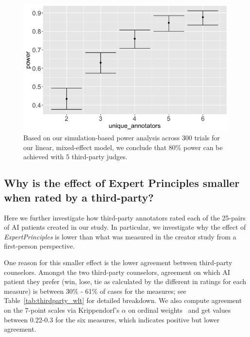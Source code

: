 \documentclass[11pt]{article}
\begin{document}
\begin{figure}[t]
    \centering
    \includegraphics[width=\columnwidth]{figures/power-analysis-300.png}
    \caption{Based on our simulation-based power analysis across 300 trials for our linear, mixed-effect model, we conclude that 80\% power can be achieved with 5 third-party judges.}
    \label{fig:power-analysis}
\end{figure}

\subsection{Why is the effect of Expert Principles smaller when rated by a third-party?} \label{appendix-sec:thirdparty-qual-analysis}

Here we further investigate how third-party annotators rated each of the 25-pairs of AI patients created in our study. In particular, we investigate why the effect of \textit{ExpertPrinciples} is lower than what was measured in the creator study from a first-person perspective. 

One reason for this smaller effect is the lower agreement between third-party counselors. Amongst the two third-party counselors, agreement on which AI patient they prefer (win, lose, tie as calculated by the different in ratings for each measure) is between 30\% - 61\% of cases for the measures; see Table~\ref{tab:thirdparty_wlt} for detailed breakdown. We also compute agreement on the 7-point scales via Krippendorf's $\alpha$ on ordinal weights~\cite{antoine-etal-2014-weighted} and get values between 0.22-0.3 for the six measures, which indicates positive but lower agreement. 
\end{document}
